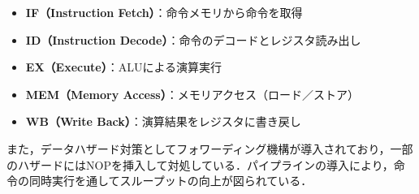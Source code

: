 \documentclass[autodetect-engine,dvi=dvipdfmx,ja=standard,
               a4j,11pt]{bxjsarticle}
\begin{document}
\begin{itemize}
\item \textbf{IF（Instruction Fetch）}：命令メモリから命令を取得
\item \textbf{ID（Instruction Decode）}：命令のデコードとレジスタ読み出し
\item \textbf{EX（Execute）}：ALUによる演算実行
\item \textbf{MEM（Memory Access）}：メモリアクセス（ロード／ストア）
\item \textbf{WB（Write Back）}：演算結果をレジスタに書き戻し
\end{itemize}

また，データハザード対策としてフォワーディング機構が導入されており，一部のハザードにはNOPを挿入して対処している．パイプラインの導入により，命令の同時実行を通してスループットの向上が図られている．
\end{document}
